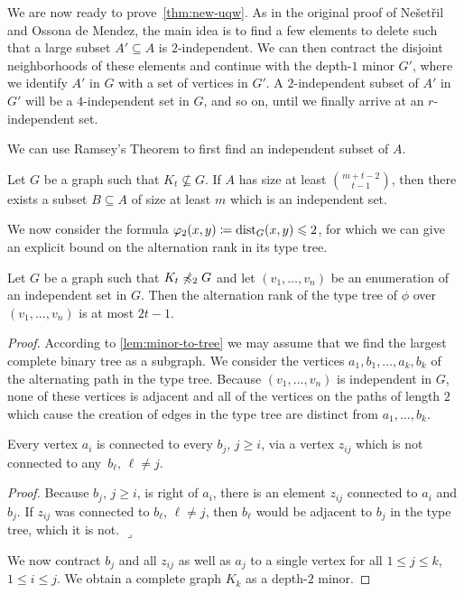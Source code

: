 We are now ready to prove~\cref{thm:new-uqw}. As in the 
original proof of Ne\v{s}et\v{r}il and Ossona de Mendez, the main 
idea is to find a few elements to delete such that a large
subset $A'\subseteq A$ is $2$-independent. We can then 
contract the disjoint neighborhoods of these elements and
continue with the depth-$1$ minor $G'$, where we 
identify $A'$ in $G$ with a set of vertices in $G'$. A $2$-independent
subset of $A'$ in $G'$ will be a $4$-independent set in $G$, 
and so on, until we finally arrive at an $r$-independent set. 

We can use Ramsey's Theorem to first find an independent subset
of $A$. 

\begin{lemma}
Let $G$ be a graph such that $K_t\not\subseteq G$. If $A$
has size at least $\binom{m+t-2}{t-1}$, then there exists
a subset $B\subseteq A$ of size at least $m$ which is an
independent set. 
\end{lemma}

We now consider the formula 
$\varphi_2(x,y)\coloneqq \mathrm{dist}_G(x,y)\leqslant 2$, for which we can give an explicit 
bound on the alternation rank in its type tree. 

\begin{theorem}
Let $G$ be a graph such that $K_t\not\preccurlyeq_2G$ and let
$(v_1,\ldots, v_n)$ be an enumeration of an independent set 
in $G$. Then the alternation rank of the type tree of $\phi$ 
over $(v_1,\ldots, v_n)$ is at most $2t-1$. 
\end{theorem}
\begin{proof}
According to \cref{lem:minor-to-tree} we may assume that we find
the largest complete binary tree as a subgraph. We consider the
vertices $a_1,b_1,\ldots, a_k,b_k$ of the alternating path in the
type tree. Because $(v_1,\ldots, v_n)$ is independent in $G$, 
none of these vertices is adjacent and all of the vertices on the
paths of length $2$ which cause the creation of edges in the type
tree are distinct from $a_1,\ldots, b_k$. 

\begin{claim}
Every vertex $a_i$ is connected to every $b_j$, $j\geq i$,
via a vertex $z_{ij}$ which is not connected to any~$b_\ell$, $\ell\neq j$. 
\end{claim}

\noindent\textit{Proof.} Because $b_j$, $j\geq i$, is right of $a_i$, there is 
an element $z_{ij}$ connected to $a_i$ and $b_j$. If $z_{ij}$ was 
connected to $b_\ell$, $\ell\neq j$, then $b_\ell$ would be adjacent 
to $b_j$ in the type tree, which it is not. \hfill$\lrcorner$

\bigskip
We now contract $b_j$ and all $z_{ij}$ as well as $a_j$ to a single 
vertex for all $1\leq j\leq k$, $1\leq i\leq j$. We obtain a complete
graph $K_k$ as a depth-$2$ minor. 
\end{proof}

